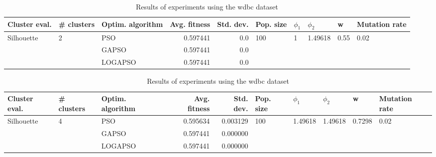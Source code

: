 \documentclass{article}
\begin{document}
\begin{table}
\centering
\caption{Results of experiments using the wdbc dataset}
\begin{tabular}{lllrrlllll}
\toprule
              Cluster eval. &        \# clusters & Optim. algorithm &  Avg. fitness &  Std. dev. &            Pop. size &         $\phi_{1}$ &               $\phi_{2}$ &                     w &         Mutation rate \\
\midrule
\multirow{3}{*}{Silhouette} & \multirow{3}{*}{2} &              PSO &      0.597441 &        0.0 & \multirow{3}{*}{100} & \multirow{3}{*}{1} & \multirow{3}{*}{1.49618} & \multirow{3}{*}{0.55} & \multirow{3}{*}{0.02} \\
                            &                    &            GAPSO &      0.597441 &        0.0 &                      &                    &                          &                       &                       \\
                            &                    &          LOGAPSO &      0.597441 &        0.0 &                      &                    &                          &                       &                       \\
\bottomrule
\end{tabular}
\end{table}
\begin{table}
\centering
\caption{Results of experiments using the wdbc dataset}
\begin{tabular}{lllrrlllll}
\toprule
              Cluster eval. &        \# clusters & Optim. algorithm &  Avg. fitness &  Std. dev. &            Pop. size &               $\phi_{1}$ &               $\phi_{2}$ &                       w &         Mutation rate \\
\midrule
\multirow{3}{*}{Silhouette} & \multirow{3}{*}{4} &              PSO &      0.595634 &   0.003129 & \multirow{3}{*}{100} & \multirow{3}{*}{1.49618} & \multirow{3}{*}{1.49618} & \multirow{3}{*}{0.7298} & \multirow{3}{*}{0.02} \\
                            &                    &            GAPSO &      0.597441 &   0.000000 &                      &                          &                          &                         &                       \\
                            &                    &          LOGAPSO &      0.597441 &   0.000000 &                      &                          &                          &                         &                       \\
\bottomrule
\end{tabular}
\end{table}
\end{document}
